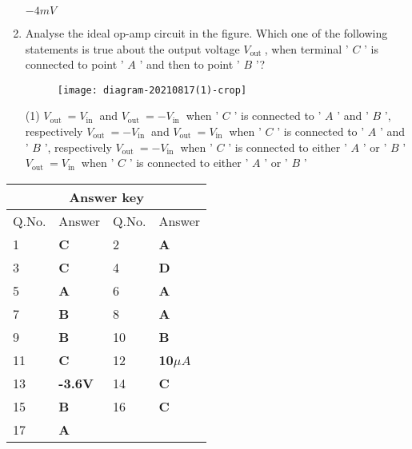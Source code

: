 \begin{enumerate}
\begin{tasks}
 		\task[\textbf{D.}] $-4 m V$
 	\end{tasks}
 	\item Analyse the ideal op-amp circuit in the figure. Which one of the following statements is true about the output voltage $V_{\text {out }}$, when terminal ' $C$ ' is connected to point ' $A$ ' and then to point ' $B$ '?
 	{}
 	\begin{figure}[H]
 		\centering
 		\texttt{[image: diagram-20210817(1)-crop]}
 	\end{figure}
 	\begin{tasks}(1)
 		\task[\textbf{A.}] $V_{\text {out }}=V_{\text {in }}$ and $V_{\text {out }}=-V_{\text {in }}$ when ' $C$ ' is connected to ' $A$ ' and ' $B$ ', respectively
 		\task[\textbf{B.}] $V_{\text {out }}=-V_{\text {in }}$ and $V_{\text {out }}=V_{\text {in }}$ when ' $C$ ' is connected to ' $A$ ' and ' $B$ ', respectively
 		\task[\textbf{C.}] $V_{\text {out }}=-V_{\text {in }}$ when ' $C$ ' is connected to either ' $A$ ' or ' $B$ '
 		\task[\textbf{D.}]  $V_{\text {out }}=V_{\text {in }}$ when ' $C$ ' is connected to either ' $A$ ' or ' $B$ '
 	\end{tasks}

 \end{enumerate}
\setlength\arrayrulewidth{1pt}
\begin{table}[H]
	\centering
	\begin{tabular}{|p{1.5cm}|p{1.5cm}||p{1.5cm}|p{1.5cm}|}
		\hline
		\multicolumn{4}{|c|}{\textbf{Answer key}}\\\hline\hline
		\rowcolor{ocrel}Q.No.&Answer&Q.No.&Answer\\\hline
		1&\textbf{C} &2&\textbf{A}\\\hline 
		3&\textbf{C} &4&\textbf{D} \\\hline
		5&\textbf{A} &6&\textbf{A} \\\hline
		7&\textbf{B}&8&\textbf{A}\\\hline
		9&\textbf{B}&10&\textbf{B}\\\hline
		11&\textbf{C} &12&\textbf{10$\mu A$}\\\hline
		13&\textbf{-3.6V}&14&\textbf{C}\\\hline
		15&\textbf{B}&16&\textbf{C}\\\hline
		17&\textbf{A}&&\textbf{}\\\hline
	\end{tabular}
\end{table}
